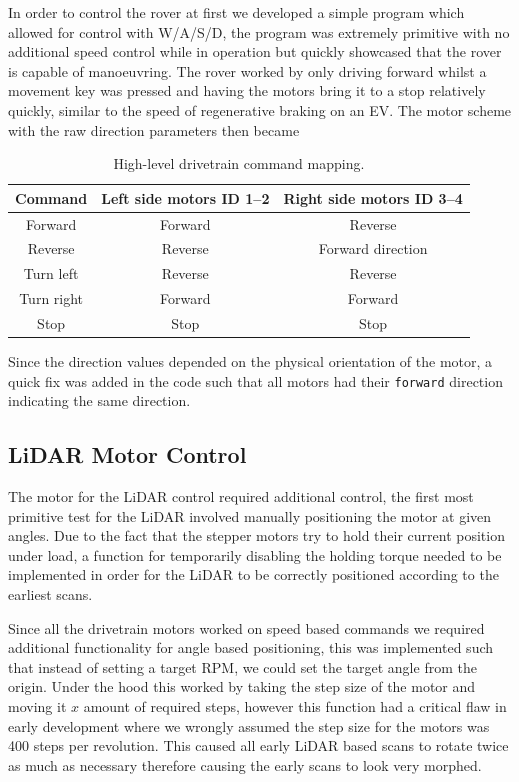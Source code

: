 In order to control the rover at first we developed a simple program which allowed for control with W/A/S/D, the program was extremely primitive with no additional speed control while in operation but quickly showcased that the rover is capable of manoeuvring.
The rover worked by only driving forward whilst a movement key was pressed and having the motors bring it to a stop relatively quickly, similar to the speed of regenerative braking on an EV. 
The motor scheme with the raw direction parameters then became

\begin{table}[H]
\centering
\caption{High-level drivetrain command mapping.}
\label{tab:drivetrain_mapping}
\begin{tabular}{c c c}
\hline
Command & Left side motors ID 1--2 & Right side motors ID 3--4 \\
\hline
Forward & Forward  & Reverse \\
Reverse & Reverse & Forward direction \\
Turn left & Reverse & Reverse \\
Turn right & Forward & Forward \\
Stop & Stop & Stop \\
\hline
\end{tabular}
\end{table}

Since the direction values depended on the physical orientation of the motor, a quick fix was added in the code such that all motors had their \texttt{forward} direction indicating the same direction.

\subsection{LiDAR Motor Control}
The motor for the LiDAR control required additional control, the first most primitive test for the LiDAR involved manually positioning the motor at given angles.
Due to the fact that the stepper motors try to hold their current position under load, a function for temporarily disabling the holding torque needed to be implemented in order for the LiDAR to be correctly positioned according to the earliest scans.

Since all the drivetrain motors worked on speed based commands we required additional functionality for angle based positioning, this was implemented such that instead of setting a target RPM, we could set the target angle from the origin.
Under the hood this worked by taking the step size of the motor and moving it \(x\) amount of required steps, however this function had a critical flaw in early development where we wrongly assumed the step size for the motors was 400 steps per revolution.
This caused all early LiDAR based scans to rotate twice as much as necessary therefore causing the early scans to look very morphed.

